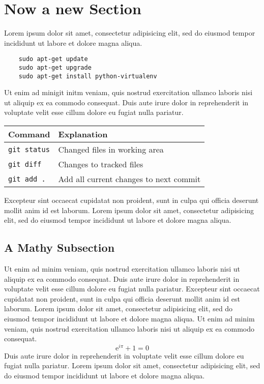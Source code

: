 \documentclass{modernCS}
\begin{document}
\section{Now a new Section}
Lorem ipsum dolor sit amet, consectetur adipisicing elit, sed do eiusmod
tempor incididunt ut labore et dolore magna aliqua.
\begin{lstlisting}
	sudo apt-get update
	sudo apt-get upgrade
	sudo apt-get install python-virtualenv
\end{lstlisting}
Ut enim ad minigit initm veniam,
quis nostrud exercitation ullamco laboris nisi ut aliquip ex ea commodo
consequat. Duis aute irure dolor in reprehenderit in voluptate velit esse
cillum dolore eu fugiat nulla pariatur.
\begin{center}
\begin{tabular}{ll}
\toprule
Command & Explanation \\
\midrule
\verb+git status+ & Changed files in working area \\
\verb+git diff+ & Changes to tracked files \\
\verb+git add .+ & Add all current changes to next commit \\
\bottomrule
\end{tabular}
\end{center}
Excepteur sint occaecat cupidatat non
proident, sunt in culpa qui officia deserunt mollit anim id est laborum.
Lorem ipsum dolor sit amet, consectetur adipisicing elit, sed do eiusmod
tempor incididunt ut labore et dolore magna aliqua.
\subsection{A Mathy Subsection}
Ut enim ad minim veniam,
quis nostrud exercitation ullamco laboris nisi ut aliquip ex ea commodo
consequat. Duis aute irure dolor in reprehenderit in voluptate velit esse
cillum dolore eu fugiat nulla pariatur. Excepteur sint occaecat cupidatat non
proident, sunt in culpa qui officia deserunt mollit anim id est laborum.
Lorem ipsum dolor sit amet, consectetur adipisicing elit, sed do eiusmod
tempor incididunt ut labore et dolore magna aliqua. Ut enim ad minim veniam,
quis nostrud exercitation ullamco laboris nisi ut aliquip ex ea commodo
consequat.
\[
\mathrm{e}^{i\pi} + 1 = 0
\]
Duis aute irure dolor in reprehenderit in voluptate velit esse
cillum dolore eu fugiat nulla pariatur.
Lorem ipsum dolor sit amet, consectetur adipisicing elit, sed do eiusmod
tempor incididunt ut labore et dolore magna aliqua.
\end{document}
